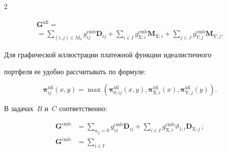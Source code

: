 \begin{multicols}{2}
{





}





\noindent


\begin{multline*}


  \boldsymbol{G}^{\mathrm{idl}}={}\\


  {}=\sum\limits_{(i,j)\in M_0} g_{ij}^{\mathrm{cmb}} 


\boldsymbol{D}_{ij} +\sum\limits_{i\in I} 


g_{\mathrm{X};i}^{\mathrm{cmb}}\boldsymbol{M}_{\mathrm{X};i}+\sum\limits_{j\in J} 


g^{\mathrm{cmb}}_{Y;j}\boldsymbol{M}_{\mathrm{Y};j}.


  \end{multline*}


  


  Для графической иллюстрации платежной функции идеалистичного 


портфеля ее удобно рассчитывать по формуле:


  \begin{equation}


  \boldsymbol{\pi}_{ij}^{\mathrm{idl}}(x,y)=\max \left( \boldsymbol{\pi}_{0;ij}^{\mathrm{idl}} (x,y), 


\boldsymbol{\pi}_{\mathrm{X};i}^{\mathrm{idl}}(x), 


\boldsymbol{\pi}_{\mathrm{Y};j}^{\mathrm{idl}}(y)\right).\!\!


  \label{e15-ags}


  \end{equation}


  


  В задачах~$B$ и~$C$ соответственно: 


  \begin{align*}


  \boldsymbol{G}^{\mathrm{cmb}} &= \sum\limits_{a_{ij}=0} 


g_{ij}^{\mathrm{cmb}}\boldsymbol{D}_{ij} + \sum\limits_{i\in I} 


g^{\mathrm{cmb}}_{\mathrm{X};i}\vartheta_{1;i} \boldsymbol{D}_{\mathrm{X};j}\,;\\


  \boldsymbol{G}^{\mathrm{cmb}} &= \sum\limits_{i\in I} 



\end{align*}
\end{multicols}
